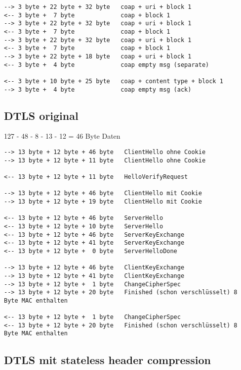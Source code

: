 \begin{verbatim}
--> 3 byte + 22 byte + 32 byte   coap + uri + block 1
<-- 3 byte +  7 byte             coap + block 1
--> 3 byte + 22 byte + 32 byte   coap + uri + block 1
<-- 3 byte +  7 byte             coap + block 1
--> 3 byte + 22 byte + 32 byte   coap + uri + block 1
<-- 3 byte +  7 byte             coap + block 1
--> 3 byte + 22 byte + 18 byte   coap + uri + block 1
<-- 3 byte +  4 byte             coap empty msg (separate)

<-- 3 byte + 10 byte + 25 byte   coap + content type + block 1
--> 3 byte +  4 byte             coap empty msg (ack)
\end{verbatim}

\subsection{DTLS original}
127 - 48 - 8 - 13 - 12 = 46 Byte Daten

\begin{verbatim}
--> 13 byte + 12 byte + 46 byte   ClientHello ohne Cookie
--> 13 byte + 12 byte + 11 byte   ClientHello ohne Cookie

<-- 13 byte + 12 byte + 11 byte   HelloVerifyRequest

--> 13 byte + 12 byte + 46 byte   ClientHello mit Cookie
--> 13 byte + 12 byte + 19 byte   ClientHello mit Cookie

<-- 13 byte + 12 byte + 46 byte   ServerHello
<-- 13 byte + 12 byte + 10 byte   ServerHello
<-- 13 byte + 12 byte + 46 byte   ServerKeyExchange
<-- 13 byte + 12 byte + 41 byte   ServerKeyExchange
<-- 13 byte + 12 byte +  0 byte   ServerHelloDone

--> 13 byte + 12 byte + 46 byte   ClientKeyExchange
--> 13 byte + 12 byte + 41 byte   ClientKeyExchange
--> 13 byte + 12 byte +  1 byte   ChangeCipherSpec
--> 13 byte + 12 byte + 20 byte   Finished (schon verschlüsselt) 8 Byte MAC enthalten

<-- 13 byte + 12 byte +  1 byte   ChangeCipherSpec
<-- 13 byte + 12 byte + 20 byte   Finished (schon verschlüsselt) 8 Byte MAC enthalten
 \end{verbatim}

\subsection{DTLS mit stateless header compression}

